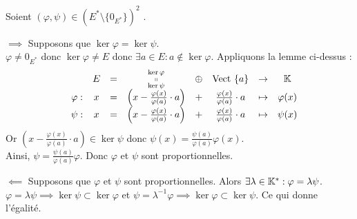 \documentclass{article}
\begin{document}
\begin{question_kholle}
		Soient $\left(\varphi,\psi\right) \in \left( E^* \setminus \{0_{E^*}\} \right) ^2$ \fqs.
		
		$\implies$ Supposons que $\ker \varphi = \ker \psi$. \\
		$\varphi \neq 0_{E^*}$ donc $\ker \varphi \neq E$ donc $\exists a \in E : a \notin \ker \varphi$. Appliquons la lemme ci-dessus :
		\begin{equation*}
			\begin{array}{ccccccccc}
				& & E &=& \substack{\ker \varphi \\ \shortparallel \\ \ker \psi} &\oplus& \text{Vect }{\{a\}} & \rightarrow & \mathbb K \\
				& \varphi : & x &=& \left( x - \frac{\varphi(x)}{\varphi(a)} \cdot a \right) &+& \frac{\varphi(x)}{\varphi(a)} \cdot a & \mapsto & \varphi(x) \\
				& \psi : & x &=& \left( x - \frac{\varphi(x)}{\varphi(a)} \cdot a \right) &+& \frac{\varphi(x)}{\varphi(a)} \cdot a & \mapsto & \psi(x)
			\end{array}
		\end{equation*}
		Or $\left( x - \frac{\varphi(x)}{\varphi(a)} \cdot a \right) \in \ker \psi$ donc $\psi(x) = \frac{\psi(a)}{\varphi(a)} \varphi(x)$. \\
		Ainsi, $\psi = \frac{\psi(a)}{\varphi(a)} \varphi$. Donc $\varphi$ et $\psi$ sont proportionnelles.
		
		$\impliedby$ Supposons que $\varphi$ et $\psi$ sont proportionnelles. Alors $\exists \lambda \in \mathbb K^* : \varphi = \lambda \psi$. \\
		$\varphi = \lambda \psi \implies \ker \psi \subset \ker \varphi$ et
		$\psi = \lambda^{-1} \varphi \implies \ker \varphi \subset \ker \psi$. Ce qui donne l'égalité.
	\end{question_kholle}
	
\end{document}
